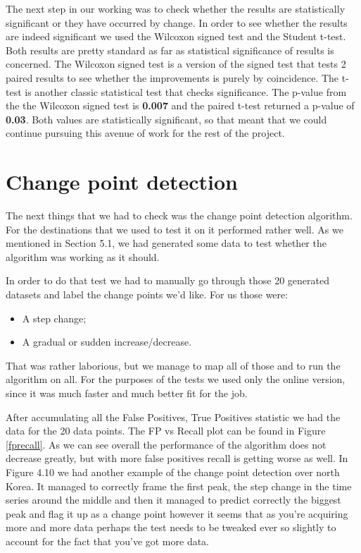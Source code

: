 \documentclass[minf,twoside,singlespacing,parskip,notimes,deptreport]{infthesis} %
\begin{document}
The next step in our working was to check whether the results are statistically significant or they have occurred by change. In order to see whether the results are indeed significant we used the Wilcoxon signed test and the Student t-test. Both results are pretty standard as far as statistical significance of results is concerned. The Wilcoxon signed test is a version of the signed test that tests 2 paired results to see whether the improvements is purely by coincidence. The t-test is another classic statistical test that checks significance. The p-value from the the Wilcoxon signed test is \textbf{0.007} and the paired t-test returned a p-value of \textbf{0.03}. Both values are statistically significant, so that meant that we could continue pursuing this avenue of work for the rest of the project. 

\section{Change point detection}

The next things that we had to check was the change point detection algorithm. For the destinations that we used to test it on it performed rather well. As we mentioned in Section 5.1, we had generated some data to test whether the algorithm was working as it should.

In order to do that test we had to manually go through those 20 generated datasets and label the change points we'd like. For us those were:
\begin{itemize}
\item A step change;
\item A gradual or sudden increase/decrease.
\end{itemize}
That was rather laborious, but we manage to map all of those and to run the algorithm on all. For the purposes of the tests we used only the online version, since it was much faster and much better fit for the job. 

After accumulating all the False Positives, True Positives statistic we had the data for the 20 data points. The FP vs Recall plot can be found in Figure \ref{fprecall}. As we can see overall the performance of the algorithm does not decrease greatly, but with more false positives recall is getting worse as well. In Figure 4.10 we had another example of the change point detection over north Korea. It managed to correctly frame the first peak, the step change in the time series around the middle and then it managed to predict correctly the biggest peak and flag it up as a change point however it seems that as you're acquiring more and more data perhaps the test needs to be tweaked ever so slightly to account for the fact that you've got more data.
\end{document}

